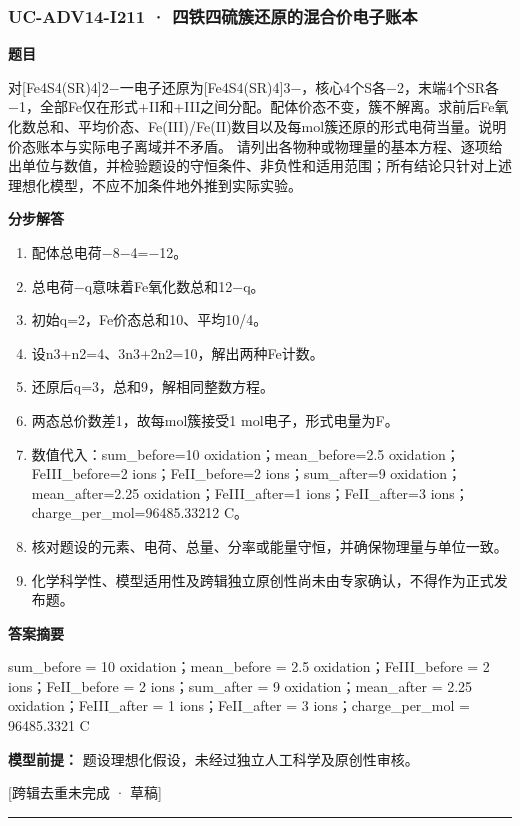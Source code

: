 \documentclass[UTF8,11pt,a4paper]{ctexart}
\begin{document}
\subsubsection*{UC-ADV14-I211 · 四铁四硫簇还原的混合价电子账本}
\noindent\textbf{题目}\par
对[Fe4S4(SR)4]2−一电子还原为[Fe4S4(SR)4]3−，核心4个S各−2，末端4个SR各−1，全部Fe仅在形式+II和+III之间分配。配体价态不变，簇不解离。求前后Fe氧化数总和、平均价态、Fe(III)/Fe(II)数目以及每mol簇还原的形式电荷当量。说明价态账本与实际电子离域并不矛盾。 请列出各物种或物理量的基本方程、逐项给出单位与数值，并检验题设的守恒条件、非负性和适用范围；所有结论只针对上述理想化模型，不应不加条件地外推到实际实验。\par
\medskip\noindent\textbf{分步解答}
\begin{enumerate}
\item 配体总电荷−8−4=−12。
\item 总电荷−q意味着Fe氧化数总和12−q。
\item 初始q=2，Fe价态总和10、平均10/4。
\item 设n3+n2=4、3n3+2n2=10，解出两种Fe计数。
\item 还原后q=3，总和9，解相同整数方程。
\item 两态总价数差1，故每mol簇接受1 mol电子，形式电量为F。
\item 数值代入：sum\_before=10 oxidation；mean\_before=2.5 oxidation；FeIII\_before=2 ions；FeII\_before=2 ions；sum\_after=9 oxidation；mean\_after=2.25 oxidation；FeIII\_after=1 ions；FeII\_after=3 ions；charge\_per\_mol=96485.33212 C。
\item 核对题设的元素、电荷、总量、分率或能量守恒，并确保物理量与单位一致。
\item 化学科学性、模型适用性及跨辑独立原创性尚未由专家确认，不得作为正式发布题。
\end{enumerate}
\noindent\textbf{答案摘要}\par
sum\_before = 10 oxidation；mean\_before = 2.5 oxidation；FeIII\_before = 2 ions；FeII\_before = 2 ions；sum\_after = 9 oxidation；mean\_after = 2.25 oxidation；FeIII\_after = 1 ions；FeII\_after = 3 ions；charge\_per\_mol = 96485.3321 C\par
\noindent\textbf{模型前提：}
题设理想化假设，未经过独立人工科学及原创性审核。\par
\noindent\textcolor{red!65!black}{[跨辑去重未完成 · 草稿]} \par
\medskip\hrule\medskip
{}
\end{document}
